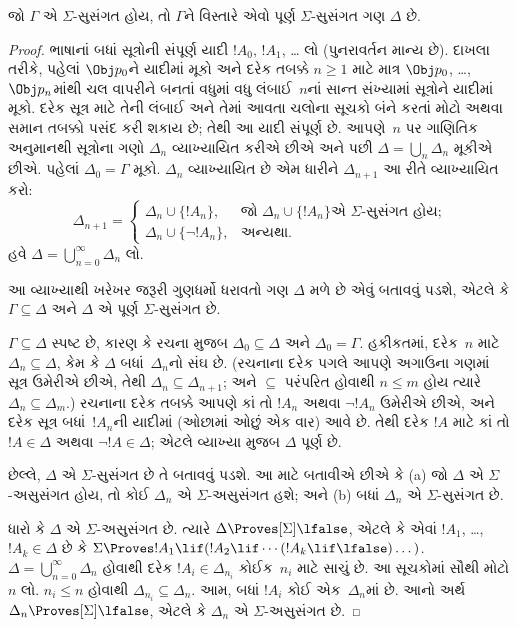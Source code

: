 \begin{thm}
  જો $\Gamma$ એ $\Sigma$-સુસંગત હોય, તો $\Gamma$ને વિસ્તારે એવો
  પૂર્ણ $\Sigma$-સુસંગત ગણ $\Delta$ છે.
\end{thm}

\begin{proof}
ભાષાનાં બધાં સૂત્રોની સંપૂર્ણ યાદી $!A_0$, $!A_1$, \dots{} લો
(પુનરાવર્તન માન્ય છે). દાખલા તરીકે, પહેલાં $\Obj p_0$ને યાદીમાં
મૂકો અને દરેક તબક્કે $n \ge 1$ માટે માત્ર $\Obj p_0$,
\dots,~$\Obj p_n$માંથી ચલ વાપરીને બનતાં વધુમાં વધુ લંબાઈ~$n$નાં
સાન્ત સંખ્યામાં સૂત્રોને યાદીમાં મૂકો. દરેક સૂત્ર માટે તેની લંબાઈ
અને તેમાં આવતા ચલોના સૂચકો બંને કરતાં મોટો અથવા સમાન તબક્કો
પસંદ કરી શકાય છે; તેથી આ યાદી સંપૂર્ણ છે.
આપણે~$n$ પર ગાણિતિક અનુમાનથી સૂત્રોના
ગણો $\Delta_n$ વ્યાખ્યાયિત કરીએ છીએ અને પછી $\Delta = \bigcup_n
\Delta_n$ મૂકીએ છીએ. પહેલાં $\Delta_0 = \Gamma$ મૂકો. $\Delta_n$
વ્યાખ્યાયિત છે એમ ધારીને $\Delta_{n+1}$ આ રીતે વ્યાખ્યાયિત કરો:
\[
\Delta_{n+1} =
\begin{cases}
  \Delta_n \cup \{!A_n\}, & \text{જો $\Delta_n \cup \{ !A_n\}$
    એ $\Sigma$-સુસંગત હોય;} \\
  \Delta_n \cup \{ \lnot !A_n\}, & \text{અન્યથા.}
\end{cases}
\]
હવે $\Delta = \bigcup_{n=0}^\infty \Delta_n$ લો.

આ વ્યાખ્યાથી ખરેખર જરૂરી ગુણધર્મો ધરાવતો ગણ $\Delta$ મળે છે એવું
બતાવવું પડશે, એટલે કે $\Gamma \subseteq \Delta$ અને $\Delta$ એ
પૂર્ણ $\Sigma$-સુસંગત છે.

$\Gamma \subseteq \Delta$ સ્પષ્ટ છે, કારણ કે રચના મુજબ $\Delta_0
\subseteq \Delta$ અને $\Delta_0 = \Gamma$. હકીકતમાં, દરેક~$n$ માટે
$\Delta_n \subseteq \Delta$, કેમ કે $\Delta$ બધાં~$\Delta_n$નો સંઘ
છે. (રચનાના દરેક પગલે આપણે અગાઉના ગણમાં સૂત્ર ઉમેરીએ છીએ,
તેથી $\Delta_n \subseteq \Delta_{n+1}$; અને $\subseteq$ પરંપરિત
હોવાથી $n \le m$ હોય ત્યારે $\Delta_n \subseteq \Delta_{m}$.)
રચનાના દરેક તબક્કે આપણે કાં તો $!A_n$ અથવા $\lnot !A_n$ ઉમેરીએ
છીએ, અને દરેક સૂત્ર બધાં~$!A_n$ની યાદીમાં (ઓછામાં ઓછું એક વાર)
આવે છે. તેથી દરેક $!A$ માટે કાં તો $!A \in \Delta$ અથવા
$\lnot !A \in \Delta$; એટલે વ્યાખ્યા મુજબ $\Delta$ પૂર્ણ છે.

છેલ્લે, $\Delta$ એ $\Sigma$-સુસંગત છે તે બતાવવું પડશે. આ માટે
બતાવીએ છીએ કે (a) જો $\Delta$ એ $\Sigma$-અસુસંગત હોય, તો કોઈ
$\Delta_n$ એ $\Sigma$-અસુસંગત હશે; અને (b) બધાં $\Delta_n$ એ
$\Sigma$-સુસંગત છે.

ધારો કે $\Delta$ એ $\Sigma$-અસુસંગત છે. ત્યારે $\Delta
\Proves[\Sigma] \lfalse$, એટલે કે એવાં $!A_1$, \dots,~$!A_k \in
\Delta$ છે કે $\Sigma \Proves !A_1 \lif (!A_2 \lif \cdots (!A_k
\lif \lfalse)\dots)$. $\Delta = \bigcup_{n=0}^\infty \Delta_n$
હોવાથી દરેક $!A_i \in \Delta_{n_i}$ કોઈક~$n_i$ માટે સાચું છે.
આ સૂચકોમાં સૌથી મોટો $n$ લો. $n_i \le n$ હોવાથી $\Delta_{n_i}
\subseteq \Delta_n$. આમ, બધાં $!A_i$ કોઈ એક~$\Delta_n$માં છે.
આનો અર્થ $\Delta_n \Proves[\Sigma] \lfalse$, એટલે કે $\Delta_n$
એ $\Sigma$-અસુસંગત છે.


\end{proof}
